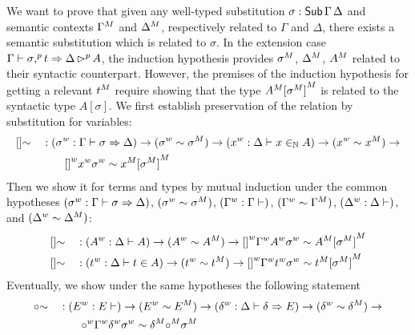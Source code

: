  We want to prove that given any well-typed substitution $\sigma
: \mathsf{Sub}\,\Gamma\,\Delta$ and semantic contexts ${\Gamma}^M$ and
${\Delta}^M$, respectively related to $\Gamma$ and $\Delta$, there exists a
semantic substitution which is related to $\sigma$.  In the extension case
$\Gamma\vdash \sigma {,}^p\,t\Rightarrow \Delta\,{\rhd}^p\,A$, the induction
hypothesis provides ${\sigma}^M$, ${\Delta}^M$, ${A}^M$ related to
their syntactic counterpart. However, the premises of the induction hypothesis
for getting a relevant ${t}^M$ require showing that the type
${A}^M{[{\sigma}^M]}^M$ is related to the syntactic type
$A[\sigma]$. We first establish preservation of the relation by substitution for
variables:
\begin{alignat*}{5}
  & []{\sim} && :
  ({\sigma}^w : \Gamma \vdash \sigma \Rightarrow \Delta) \rightarrow
  ({\sigma}^w \sim {\sigma}^M) \rightarrow
  ({x}^w : \Delta \vdash x \in_{\mathbb{N}} A) \rightarrow
  ({x}^w \sim {x}^M) \rightarrow
  \\ & && \qquad
   {[]}^w{x}^w{\sigma}^w \sim {x}^M{[{\sigma}^M]}^M
\end{alignat*}
Then we show it for terms and types  by mutual induction
under the common hypotheses
  $({\sigma}^w : \Gamma \vdash \sigma \Rightarrow \Delta)$,
  $({\sigma}^w \sim {\sigma}^M)$,
  $({\Gamma}^w : \Gamma \vdash )$,
  $({\Gamma}^w \sim {\Gamma}^M)$,
    $({\Delta}^w : \Delta \vdash )$,
    and
  $({\Delta}^w \sim {\Delta}^M)$:
\begin{alignat*}{5}
     & []{\sim} && :
    ({A}^w : \Delta \vdash A) \rightarrow
  ({A}^w \sim {A}^M) \rightarrow
   {[]}^w{\Gamma}^w{A}^w{\sigma}^w \sim {A}^M{[{\sigma}^M]}^M
   \\
     & []{\sim} && :
    ({t}^w : \Delta \vdash t \in A ) \rightarrow
  ({t}^w \sim {t}^M) \rightarrow
   {[]}^w{\Gamma}^w{t}^w{\sigma}^w \sim {t}^M{[{\sigma}^M]}^M
  \end{alignat*}
  Eventually, we show under the same hypotheses the following statement
  \begin{alignat*}{5}
     & {\circ}{\sim} && :
    ({E}^w : E \vdash ) \rightarrow
  ({E}^w \sim {E}^M) \rightarrow
    ({\delta}^w : \Delta \vdash \delta \Rightarrow E) \rightarrow
  ({\delta}^w \sim {\delta}^M) \rightarrow
  \\
  & && \qquad
   {{\circ}}^w{\Gamma}^w{\delta}^w{\sigma}^w \sim {\delta}^M{\circ}^M{\sigma}^M
  \end{alignat*}

